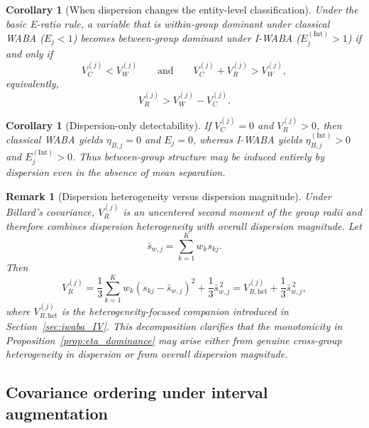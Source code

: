 \documentclass[preprint, times, 12pt, authoryear]{elsarticle}
\newtheorem{corollary}[theorem]{Corollary}
\newtheorem{remark}{Remark}
\begin{document}
 \begin{corollary}[When dispersion changes the entity-level classification]\label{cor:reclass}
 	Under the basic E-ratio rule, a variable that is within-group dominant under classical WABA ($E_j<1$) becomes between-group dominant under I-WABA ($E_j^{(\mathrm{Int})}>1$) if and only if
 	\[
 	V_C^{(j)}<V_W^{(j)}
 	\qquad\text{and}\qquad
 	V_C^{(j)}+V_R^{(j)}>V_W^{(j)},
 	\]
 	equivalently,
 	\[
 	V_R^{(j)}>V_W^{(j)}-V_C^{(j)}.
 	\]
 \end{corollary}
 
 \begin{corollary}[Dispersion-only detectability]\label{cor:spread_only}
 	If $V_C^{(j)}=0$ and $V_R^{(j)}>0$, then classical WABA yields $\eta_{B,j}=0$ and $E_j=0$, whereas I-WABA yields $\eta_{B,j}^{(\mathrm{Int})}>0$ and $E_j^{(\mathrm{Int})}>0$. Thus between-group structure may be induced entirely by dispersion even in the absence of mean separation.
 \end{corollary}
 
 \begin{remark}[Dispersion heterogeneity versus dispersion magnitude]\label{rem:VR_decomp}
 	Under Billard's covariance, $V_R^{(j)}$ is an uncentered second moment of the group radii and therefore combines dispersion heterogeneity with overall dispersion magnitude. Let
 	\[
 	\bar{s}_{w,j}=\sum_{k=1}^K w_k s_{kj}.
 	\]
 	Then
 	\[
 	V_R^{(j)}
 	=
 	\frac13\sum_{k=1}^K w_k(s_{kj}-\bar{s}_{w,j})^2
 	+
 	\frac13\bar{s}_{w,j}^{\,2}
 	=
 	V_{R,\mathrm{het}}^{(j)}+\frac13\bar{s}_{w,j}^{\,2},
 	\]
 	where $V_{R,\mathrm{het}}^{(j)}$ is the heterogeneity-focused companion introduced in Section~\ref{sec:iwaba_IV}. This decomposition clarifies that the monotonicity in Proposition~\ref{prop:eta_dominance} may arise either from genuine cross-group heterogeneity in dispersion or from overall dispersion magnitude.
 \end{remark}
 
 
 \subsection{Covariance ordering under interval augmentation}\label{sec:info_ordering}
 
\end{document}
